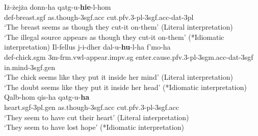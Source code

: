 \documentclass[output=paper]{LSP/langsci}
\begin{document}
\ea \label{noidiomsmtcr}
\ea 
\gll I{\.z}-{\.z}ej{\.z}a donn-ha qatg\textcrh-u-{\bf{hie}}-l-hom\\
{\sc def-}breast.{\sc sgf} as.though-{\sc 3sgf.acc} cut.{\sc pfv.3-pl-3sgf.acc-dat-3pl}\\
\glt `The breast seems as though they cut-it on-them' 
\glt \hfill{(Literal interpretation)}\\
\glt *`The illegal source appears as though they cut-it on-them' 
\glt \hfill{(*Idiomatic interpretation)}
\ex
\gll Il-fellus j-i-dher da\textcrh\textcrh l-u-{\bf{hu}}-l-ha f'mo\textcrh\textcrh-ha\\
{\sc def-}chick.{\sc sgm} 3{\sc m}-{\sc frm.vwl}-appear.{\sc impv.sg} enter.{\sc cause.pfv.3-pl-3sgm.acc-dat-3sgf} in.mind-{\sc 3sgf.gen}\\
\glt `The chick seems like they put it inside her mind' 
\glt \hfill{(Literal interpretation)}\\
\glt *`The doubt seems like they put it inside her head' 
\glt \hfill{(*Idiomatic interpretation)}
\ex 
\gll Qalb-hom qis-ha qatg\textcrh-u-{\bf{ha}}\\
heart.{\sc sgf}-{\sc 3pl.gen} as.though-{\sc 3sgf.acc} cut.{\sc pfv.3-pl-3sgf.acc}\\
\glt `They seem to have cut their heart' \hfill{(Literal interpretation)}\\
\glt *`They seem to have lost hope' \hfill{(*Idiomatic interpretation)}
\z
\z

\end{document}
